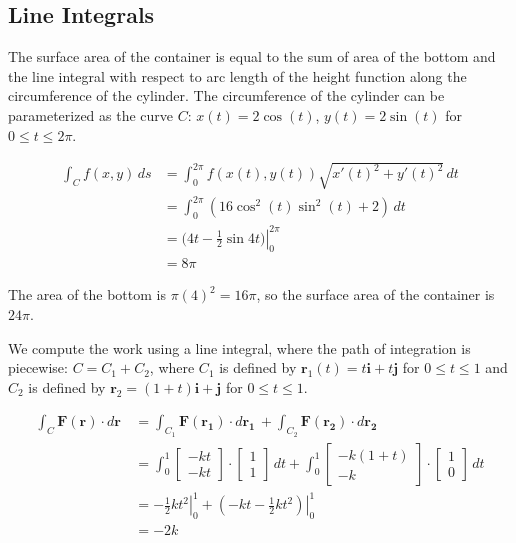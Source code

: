 \subsection{Line Integrals}

\BEN

\item The surface area of the container is equal to the sum of area of the
bottom and the line integral with respect to arc length of the height function
along the circumference of the cylinder.  The circumference of the cylinder
can be parameterized as the curve $C$: $x(t) = 2\cos(t)$, $y(t) = 2\sin(t)$
for $0 \leq t \leq 2\pi$.

\begin{align*}
 \int_C \! f(x,y) \, ds
 &= \int_{0}^{2\pi} \! f(x(t), y(t)) \sqrt{x'(t)^2 + y'(t)^2} \, dt \\
 &= \int_{0}^{2\pi} \! (16\cos^2(t)\sin^2(t) + 2) \, dt \\
 &= (\left. 4t - \frac{1}{2}\sin{4t}) \right|_{0}^{2\pi} \\
 &= 8\pi
\end{align*}

The area of the bottom is $\pi(4)^2 = 16\pi$, so the surface area of the
container is $24\pi$.

\item We compute the work using a line integral, where the path of
integration is piecewise: $C = C_1 + C_2$, where $C_1$ is defined by
$\mathbf{r}_1(t) = t\mathbf{i} + t\mathbf{j}$ for $0 \leq t \leq 1$ and $C_2$
is defined by $\mathbf{r}_2 = (1 + t)\mathbf{i} + \mathbf{j}$ for $0 \leq t
\leq 1$.

\begin{align*}
 \int_C \! \mathbf{F}(\mathbf{r}) \cdot d\mathbf{r} \,
 &= \int_{C_1} \! \mathbf{F}(\mathbf{r_1}) \cdot d\mathbf{r_1} \, +
    \int_{C_2} \! \mathbf{F}(\mathbf{r_2}) \cdot d\mathbf{r_2} \, \\
 &= \int_0^1   \! \begin{bmatrix}
                   -kt \\
                   -kt
                  \end{bmatrix} \cdot
                  \begin{bmatrix}
                   1 \\
                   1
                  \end{bmatrix}
                  \, dt +
    \int_0^1   \! \begin{bmatrix}
                   -k(1 + t) \\
                   -k
                  \end{bmatrix} \cdot
                  \begin{bmatrix}
                   1 \\
                   0
                  \end{bmatrix}
                  \, dt \\
 &= \left. -\frac{1}{2}kt^2 \right|_0^1 +
    \left. (-kt - \frac{1}{2}kt^2) \right|_0^1 \\
 &= -2k
\end{align*}

